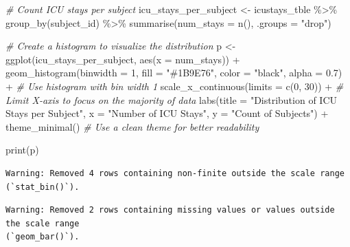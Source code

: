 \documentclass[
]{article}
\newenvironment{Shaded}{\begin{snugshade}}{\end{snugshade}}
\newcommand{\AttributeTok}[1]{\textcolor[rgb]{0.77,0.63,0.00}{#1}}
\newcommand{\CommentTok}[1]{\textcolor[rgb]{0.56,0.35,0.01}{\textit{#1}}}
\newcommand{\DecValTok}[1]{\textcolor[rgb]{0.00,0.00,0.81}{#1}}
\newcommand{\FloatTok}[1]{\textcolor[rgb]{0.00,0.00,0.81}{#1}}
\newcommand{\FunctionTok}[1]{\textcolor[rgb]{0.00,0.00,0.00}{#1}}
\newcommand{\NormalTok}[1]{\textcolor[rgb]{0.00,0.00,0.00}{#1}}
\newcommand{\OtherTok}[1]{\textcolor[rgb]{0.56,0.35,0.01}{#1}}
\newcommand{\SpecialCharTok}[1]{\textcolor[rgb]{0.00,0.00,0.00}{#1}}
\newcommand{\StringTok}[1]{\textcolor[rgb]{0.31,0.60,0.02}{#1}}
\begin{document}
\begin{Shaded}
\begin{Highlighting}[]
\CommentTok{\# Count ICU stays per subject}
\NormalTok{icu\_stays\_per\_subject }\OtherTok{\textless{}{-}}\NormalTok{ icustays\_tble }\SpecialCharTok{\%\textgreater{}\%}
  \FunctionTok{group\_by}\NormalTok{(subject\_id) }\SpecialCharTok{\%\textgreater{}\%}
  \FunctionTok{summarise}\NormalTok{(}\AttributeTok{num\_stays =} \FunctionTok{n}\NormalTok{(), }\AttributeTok{.groups =} \StringTok{"drop"}\NormalTok{)}

\CommentTok{\# Create a histogram to visualize the distribution}
\NormalTok{p }\OtherTok{\textless{}{-}} \FunctionTok{ggplot}\NormalTok{(icu\_stays\_per\_subject, }\FunctionTok{aes}\NormalTok{(}\AttributeTok{x =}\NormalTok{ num\_stays)) }\SpecialCharTok{+}
  \FunctionTok{geom\_histogram}\NormalTok{(}\AttributeTok{binwidth =} \DecValTok{1}\NormalTok{, }\AttributeTok{fill =} \StringTok{"\#1B9E76"}\NormalTok{, }
                 \AttributeTok{color =} \StringTok{"black"}\NormalTok{, }\AttributeTok{alpha =} \FloatTok{0.7}\NormalTok{) }\SpecialCharTok{+}  
                  \CommentTok{\# Use histogram with bin width 1}
  \FunctionTok{scale\_x\_continuous}\NormalTok{(}\AttributeTok{limits =} \FunctionTok{c}\NormalTok{(}\DecValTok{0}\NormalTok{, }\DecValTok{30}\NormalTok{)) }\SpecialCharTok{+}  
  \CommentTok{\# Limit X{-}axis to focus on the majority of data}
  \FunctionTok{labs}\NormalTok{(}\AttributeTok{title =} \StringTok{"Distribution of ICU Stays per Subject"}\NormalTok{,}
       \AttributeTok{x =} \StringTok{"Number of ICU Stays"}\NormalTok{,}
       \AttributeTok{y =} \StringTok{"Count of Subjects"}\NormalTok{) }\SpecialCharTok{+}
  \FunctionTok{theme\_minimal}\NormalTok{()  }\CommentTok{\# Use a clean theme for better readability}

\FunctionTok{print}\NormalTok{(p)}
\end{Highlighting}
\end{Shaded}

\begin{verbatim}
Warning: Removed 4 rows containing non-finite outside the scale range
(`stat_bin()`).
\end{verbatim}

\begin{verbatim}
Warning: Removed 2 rows containing missing values or values outside the scale range
(`geom_bar()`).
\end{verbatim}
\end{document}
